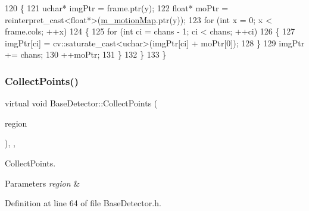 \begin{DoxyCode}
120         \{
121             uchar* imgPtr = frame.ptr(y);
122             \textcolor{keywordtype}{float}* moPtr = \textcolor{keyword}{reinterpret\_cast<}\textcolor{keywordtype}{float}*\textcolor{keyword}{>}(\mbox{\hyperlink{class_base_detector_a45a2d54a0b69e271aa5c44ee301682b7}{m\_motionMap}}.ptr(y));
123             \textcolor{keywordflow}{for} (\textcolor{keywordtype}{int} x = 0; x < frame.cols; ++x)
124             \{
125                 \textcolor{keywordflow}{for} (\textcolor{keywordtype}{int} ci = chans - 1; ci < chans; ++ci)
126                 \{
127                     imgPtr[ci] = cv::saturate\_cast<uchar>(imgPtr[ci] + moPtr[0]);
128                 \}
129                 imgPtr += chans;
130                 ++moPtr;
131             \}
132         \}
133     \}
\end{DoxyCode}
\mbox{\label{class_base_detector_a20380b0980c6f262b0829f37fb89d2a7}} 
\subsubsection{\texorpdfstring{Collect\+Points()}{CollectPoints()}}
{\footnotesize\ttfamily virtual void Base\+Detector\+::\+Collect\+Points (\begin{DoxyParamCaption}\item[{\mbox{\hyperlink{class_c_region}{C\+Region}} \&}]{region }\end{DoxyParamCaption})\hspace{0.3cm}{\ttfamily [inline]}, {\ttfamily [virtual]}, {\ttfamily [inherited]}}



Collect\+Points. 


\begin{DoxyParams}{Parameters}
{\em region} & \\
\hline
\end{DoxyParams}


Definition at line 64 of file Base\+Detector.\+h.


